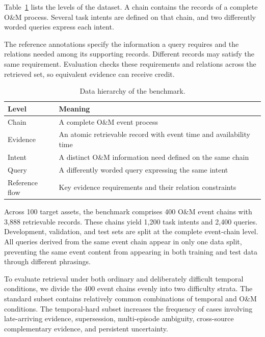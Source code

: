 Table~\ref{tab:dataset_structure} lists the levels of the dataset. A chain contains the records of a complete O\&M process. Several task intents are defined on that chain, and two differently worded queries express each intent.

The reference annotations specify the information a query requires and the relations needed among its supporting records. Different records may satisfy the same requirement. Evaluation checks these requirements and relations across the retrieved set, so equivalent evidence can receive credit.

\begin{table}[t]
\caption{Data hierarchy of the benchmark.}
\label{tab:dataset_structure}
\centering
\small
\begin{tabular}{@{}>{\centering\arraybackslash}p{}>{\centering\arraybackslash}p{}@{}}
\toprule
Level & Meaning \\
\midrule
Chain & A complete O\&M event process \\
Evidence & An atomic retrievable record with event time and availability time \\
Intent & A distinct O\&M information need defined on the same chain \\
Query & A differently worded query expressing the same intent \\
Reference flow & Key evidence requirements and their relation constraints \\
\bottomrule
\end{tabular}
\end{table}

Across 100 target assets, the benchmark comprises 400 O\&M event chains with 3,888 retrievable records. These chains yield 1,200 task intents and 2,400 queries. Development, validation, and test sets are split at the complete event-chain level. All queries derived from the same event chain appear in only one data split, preventing the same event content from appearing in both training and test data through different phrasings.

To evaluate retrieval under both ordinary and deliberately difficult temporal conditions, we divide the 400 event chains evenly into two difficulty strata. The standard subset contains relatively common combinations of temporal and O\&M conditions. The temporal-hard subset increases the frequency of cases involving late-arriving evidence, supersession, multi-episode ambiguity, cross-source complementary evidence, and persistent uncertainty.

